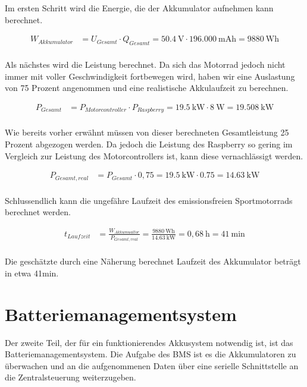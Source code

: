Im ersten Schritt wird die Energie, die der Akkumulator aufnehmen kann berechnet.

\begin{align*}
W_{Akkumulator} &= U_{Gesamt} \cdot Q_{Gesamt} = 50.4~\mathrm{V} \cdot 196.000~\mathrm{mAh} = 9880~\mathrm{Wh}\\
\end{align*}

Als nächstes wird die Leistung berechnet. Da sich das Motorrad jedoch nicht immer mit voller Geschwindigkeit fortbewegen wird, haben wir eine Auslastung von 75 Prozent angenommen und eine realistische Akkulaufzeit zu berechnen.

\begin{align*}
P_{Gesamt} &= P_{Motorcontroller} \cdot P_{Raspberry} = 19.5~\mathrm{kW} \cdot 8~\mathrm{W} = 19.508~\mathrm{kW}\\
\end{align*}

Wie bereits vorher erwähnt müssen von dieser berechneten Gesamtleistung 25 Prozent abgezogen werden. Da jedoch die Leistung des Raspberry so gering im Vergleich zur Leistung des Motorcontrollers ist, kann diese vernachlässigt werden.

\begin{align*}
P_{Gesamt,real} &= P_{Gesamt} \cdot 0,75 = 19.5~\mathrm{kW} \cdot 0.75 = 14.63~\mathrm{kW}\\
\end{align*}

Schlussendlich kann die ungefähre Laufzeit des emissionsfreien Sportmotorrads berechnet werden.

\begin{align*}
t_{Laufzeit} &= \frac{W_{Akkumualtor}}{P_{Gesamt,real}} = \frac{9880~\mathrm{Wh}}{14.63~\mathrm{kW}} = 0,68~\mathrm{h} = 41~\mathrm{min}\\
\end{align*}

Die geschätzte durch eine Näherung berechnet Laufzeit des Akkumulator beträgt in etwa 41min.
\newpage

\section{Batteriemanagementsystem}
Der zweite Teil, der für ein funktionierendes Akkusystem notwendig ist, ist das Batteriemanagementsystem. Die Aufgabe des BMS ist es die Akkumulatoren zu überwachen und an die aufgenommenen Daten über eine serielle Schnittstelle an die Zentralsteuerung weiterzugeben. 

